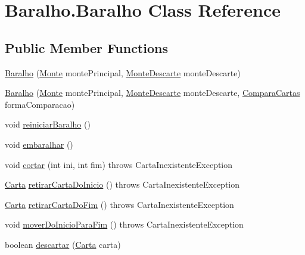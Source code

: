 \hypertarget{class_baralho_1_1_baralho}{
\section{\-Baralho.\-Baralho \-Class \-Reference}
\label{class_baralho_1_1_baralho}
}
\subsection*{\-Public \-Member \-Functions}
\begin{DoxyCompactItemize}
\item 
\hyperlink{class_baralho_1_1_baralho_ab88f90bd08144f150e97b45bd63eadfd}{\-Baralho} (\hyperlink{class_baralho_1_1_monte}{\-Monte} monte\-Principal, \hyperlink{class_baralho_1_1_monte_descarte}{\-Monte\-Descarte} monte\-Descarte)
\item 
\hyperlink{class_baralho_1_1_baralho_a039c014d8bf91ceda3b003a1ee4d2418}{\-Baralho} (\hyperlink{class_baralho_1_1_monte}{\-Monte} monte\-Principal, \hyperlink{class_baralho_1_1_monte_descarte}{\-Monte\-Descarte} monte\-Descarte, \hyperlink{interface_baralho_1_1_compara_cartas}{\-Compara\-Cartas} forma\-Comparacao)
\item 
void \hyperlink{class_baralho_1_1_baralho_ae7ce198ebeadf6c0b3fb5ad109873f1c}{reiniciar\-Baralho} ()
\item 
void \hyperlink{class_baralho_1_1_baralho_a50716e1d93b3ed27800ac62b7b9e8b8a}{embaralhar} ()
\item 
void \hyperlink{class_baralho_1_1_baralho_a6839090e52620e5b665a12aceeba06f6}{cortar} (int ini, int fim)  throws Carta\-Inexistente\-Exception
\item 
\hyperlink{class_baralho_1_1_carta}{\-Carta} \hyperlink{class_baralho_1_1_baralho_a88c1b1eec22e717be39227ed2ceb9490}{retirar\-Carta\-Do\-Inicio} ()  throws Carta\-Inexistente\-Exception
\item 
\hyperlink{class_baralho_1_1_carta}{\-Carta} \hyperlink{class_baralho_1_1_baralho_a8441347c4eb47a0ba0f3bfbdfca59a9c}{retirar\-Carta\-Do\-Fim} ()  throws Carta\-Inexistente\-Exception 
\item 
void \hyperlink{class_baralho_1_1_baralho_a9df1c0a9c5c6c227b36e434248d5698d}{mover\-Do\-Inicio\-Para\-Fim} ()  throws Carta\-Inexistente\-Exception 
\item 
boolean \hyperlink{class_baralho_1_1_baralho_ad95b8caaaf2602be21923a9c02ab741f}{descartar} (\hyperlink{class_baralho_1_1_carta}{\-Carta} carta)
\item 

\end{DoxyCompactItemize}
